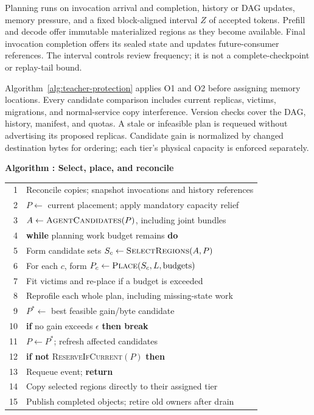 Planning runs on invocation arrival and completion, history or DAG
updates, memory pressure, and a fixed block-aligned interval $Z$ of
accepted tokens. Prefill and decode offer immutable materialized regions
as they become available. Final invocation completion offers its sealed
state and updates future-consumer references. The interval controls
review frequency; it is not a complete-checkpoint or replay-tail bound.

Algorithm~\ref{alg:teacher-protection} applies O1 and O2 before assigning
memory locations. Every candidate comparison includes current replicas,
victims, migrations, and normal-service copy interference. Version checks
cover the DAG, history, manifest, and quotas. A stale or infeasible
plan is requeued without advertising its proposed replicas. Candidate
gain is normalized by changed destination bytes for ordering; each
tier's physical capacity is enforced separately.

\par\medskip\noindent\begin{minipage}{\columnwidth}
\raggedright
{}\label{alg:teacher-protection}
\textbf{Algorithm \thedesignalgorithm: Select, place, and reconcile}
\par\smallskip
\begin{tabularx}{\columnwidth}{@{}r@{\quad}X@{}}
\toprule
1 & Reconcile copies; snapshot invocations and history references \\
2 & $P\gets$ current placement; apply mandatory capacity relief \\
3 & $A\gets\textsc{AgentCandidates}(P)$, including joint bundles \\
4 & \textbf{while} planning work budget remains \textbf{do} \\
5 & \quad Form candidate sets $S_c\gets\textsc{SelectRegions}(A,P)$ \\
6 & \quad For each $c$, form $P_c\gets\textsc{Place}(S_c,L,\text{budgets})$ \\
7 & \quad Fit victims and re-place if a budget is exceeded \\
8 & \quad Reprofile each whole plan, including missing-state work \\
9 & \quad $P^*\gets$ best feasible gain/byte candidate \\
10 & \quad \textbf{if} no gain exceeds $\epsilon$ \textbf{then break} \\
11 & \quad $P\gets P^*$; refresh affected candidates \\
12 & \textbf{if not} \textsc{ReserveIfCurrent}$(P)$ \textbf{then} \\
13 & \quad Requeue event; \textbf{return} \\
14 & Copy selected regions directly to their assigned tier \\
15 & Publish completed objects; retire old owners after drain \\
\bottomrule
\end{tabularx}
\end{minipage}\par\medskip

